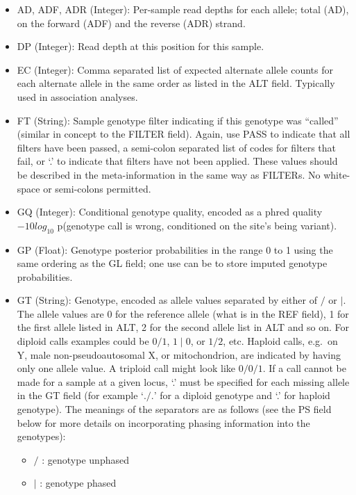 \documentclass[8pt]{article}
\begin{document}
\begin{itemize}
\renewcommand{\labelitemii}{$\circ$}
  \item AD, ADF, ADR (Integer): Per-sample read depths for each allele; total (AD), on the forward (ADF) and the reverse (ADR) strand.
  \item DP (Integer): Read depth at this position for this sample.
  \item EC (Integer): Comma separated list of expected alternate allele counts for each alternate allele in the same order as listed in the ALT field.
  Typically used in association analyses.
  \item FT (String): Sample genotype filter indicating if this genotype was ``called'' (similar in concept to the FILTER field).
  Again, use PASS to indicate that all filters have been passed, a semi-colon separated list of codes for filters that fail, or `.' to indicate that filters have not been applied.
  These values should be described in the meta-information in the same way as FILTERs.
  No white-space or semi-colons permitted.
  \item GQ (Integer): Conditional genotype quality, encoded as a phred quality $-10log_{10}$ p(genotype call is wrong, conditioned on the site's being variant).
  \item GP (Float): Genotype posterior probabilities in the range 0 to 1 using the same ordering as the GL field; one use can be to store imputed genotype probabilities.
  \item GT (String): Genotype, encoded as allele values separated by either of $/$ or $\mid$.
  The allele values are 0 for the reference allele (what is in the REF field), 1 for the first allele listed in ALT, 2 for the second allele list in ALT and so on.
  For diploid calls examples could be $0/1$, $1\mid0$, or $1/2$, etc.
  Haploid calls, e.g.\ on Y, male non-pseudoautosomal X, or mitochondrion, are indicated by having only one allele value.
  A triploid call might look like $0/0/1$.
  If a call cannot be made for a sample at a given locus, `.' must be specified for each missing allele in the GT field (for example `$./.$' for a diploid genotype and `.' for haploid genotype).
  The meanings of the separators are as follows (see the PS field below for more details on incorporating phasing information into the genotypes):
	\begin{itemize}
	  \item $/$ : genotype unphased
	  \item $\mid$ : genotype phased
	\end{itemize}


\end{itemize}
\end{document}
